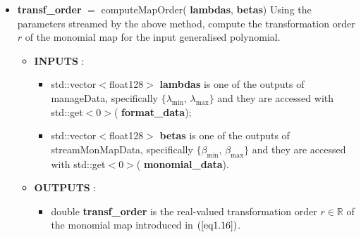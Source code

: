 \documentclass[a4paper, twosided]{book}
\begin{document}
\begin{itemize}
    \item \color{poliDarkBlue} \textbf{transf\_order} \color{black} $=$ \colorbox{poliGrayBlue}{computeMapOrder}(\color{poliDarkBlue} \textbf{lambdas}\color{black}, \color{poliDarkBlue} \textbf{betas}\color{black})
    \newline Using the parameters streamed by the above method, compute the transformation order $r$ of the monomial map for the input generalised polynomial.
    \begin{itemize}
        \item \color{poliDarkBlue} \textbf{INPUTS} \color{black}:
        \begin{itemize}
            \item \colorbox{poliGrayBlue}{std::vector$<$float128$>$} \color{poliDarkBlue} \textbf{lambdas} \color{black} is one of the outputs of \colorbox{poliGrayBlue}{manageData}, specifically $\{\lambda_{\text{min}},\,\lambda_{\text{max}}\}$ and they are accessed with \colorbox{poliGrayBlue}{std::get$<$0$>$}(\color{poliDarkBlue} \textbf{format\_data}\color{black});
            \item \colorbox{poliGrayBlue}{std::vector$<$float128$>$} \color{poliDarkBlue} \textbf{betas} \color{black} is one of the outputs of \colorbox{poliGrayBlue}{streamMonMapData}, specifically $\{\beta_{\text{min}},\,\beta_{\text{max}}\}$ and they are accessed with \colorbox{poliGrayBlue}{std::get$<$0$>$}(\color{poliDarkBlue} \textbf{monomial\_data}\color{black}).
        \end{itemize}
        \item \color{poliDarkBlue} \textbf{OUTPUTS} \color{black}:
        \begin{itemize}
            \item \colorbox{poliGrayBlue}{double} \color{poliDarkBlue} \textbf{transf\_order} \color{black} is the real-valued transformation order $r\in\mathbb{R}$ of the monomial map introduced in $(\ref{eq1.16})$.
        \end{itemize}
    \end{itemize}
    

\end{itemize}
\end{document}
